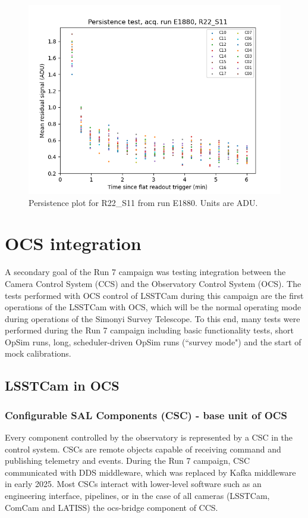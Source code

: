 \begin{figure}
    \centering
    \includegraphics[width=0.8\linewidth]{figures/ReferenceFigures/persistence_plot_LSSTCam_R22_S11_u_lsstccs_eo_persistence_E1880_w_2024_35_20241101T020526Z.png}
    \caption{Persistence plot for R22\_S11 from run E1880.  Units are ADU.}
    \label{fig:ref:persistence}
\end{figure}

\clearpage
\section{OCS integration}
A secondary goal of the Run 7 campaign was testing integration between the Camera Control System (CCS) and the Observatory Control System (OCS). The tests performed with OCS control of LSSTCam during this campaign are the first operations of the LSSTCam with OCS, which will be the normal operating mode during operations of the Simonyi Survey Telescope. To this end, many tests were performed during the Run 7 campaign including basic functionality tests, short OpSim runs, long, scheduler-driven OpSim runs (``survey mode") and the start of mock calibrations.

\subsection{LSSTCam in OCS}
\subsubsection{Configurable SAL Components (CSC) - base unit of OCS}

Every component controlled by the observatory is represented by a CSC in the control system. CSCs are remote objects capable of receiving command and publishing telemetry and events. During the Run 7 campaign, CSC communicated with DDS middleware, which was replaced by Kafka middleware in early 2025. Most CSCs interact with lower-level software such as an engineering interface, pipelines, or in the case of all cameras (LSSTCam, ComCam and LATISS) the ocs-bridge component of CCS.

